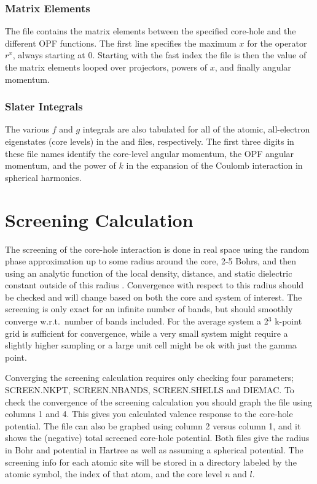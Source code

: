 \documentclass[11pt]{report}
\begin{document}
\subsection{Matrix Elements}

The  file contains the matrix elements between the specified core-hole and the different OPF functions. The first line specifies the maximum $x$ for the operator $r^x$, always starting at 0. Starting with the fast index the file is then the value of the matrix elements looped over projectors, powers of $x$, and finally angular momentum.

\subsection{Slater Integrals}
The various $f$ and $g$ integrals are also tabulated for all of the atomic, all-electron eigenstates (core levels) in the  and  files, respectively. The first three digits in these file names identify the core-level angular momentum, the OPF angular momentum, and the power of $k$ in the expansion of the Coulomb interaction in spherical harmonics. 

\chapter{Screening Calculation}
\label{screening}

The screening of the core-hole interaction is done in real space using the random phase approximation up to 
some radius around the core, 2-5 Bohrs, and then using an analytic function of the local density, distance, 
and static dielectric constant outside of this radius \cite{Shirley2006986}. Convergence with respect to this radius should be 
checked and will change based on both the core and system of interest. The screening is only exact for an 
infinite number of bands, but should smoothly converge w.r.t.\ number of bands included. For the average 
system a 2$^3$ k-point grid is sufficient for convergence, while a very small system might require a 
slightly higher sampling or a large unit cell might be ok with just the gamma point.

Converging the screening calculation requires only checking four parameters; SCREEN.NKPT, SCREEN.NBANDS, SCREEN.SHELLS and DIEMAC. To check the convergence of the screening calculation you should graph the file  using columns 1 and 4. This gives you calculated valence response to the core-hole potential. The file  can also be graphed using column 2 versus column 1, and it shows the (negative) total screened core-hole potential. Both files give the radius in Bohr and potential in Hartree as well as assuming a spherical potential. The screening info for each atomic site will be stored in a directory labeled by the atomic symbol, the index of that atom, and the core level $n$ and $l$.
\end{document}
